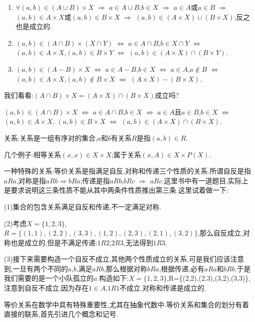 \documentclass[12pt,a4paper,openany]{book}
\begin{document}
\begin{enumerate}
\item $\forall (a,b) \in (A \cup B) \times X$ $\Rightarrow$ $a \in A \cup B$,$b \in X$ $\Rightarrow$ $a \in A$或$a \in B$ $\Rightarrow$ $(a,b) \in A \times X$或$(a,b) \in B \times X$ $\Rightarrow$ $(a,b) \in (A \times X) \cup (B \times X)$;反之也是成立的.
\item $(a,b) \in (A \cap B) \times (X \cap Y)$ $\Leftrightarrow$ $a \in A \cap B$,$b \in X \cap Y$ $\Leftrightarrow$ $(a,b) \in A \times X$,$(a,b) \in B \times Y$ $\Leftrightarrow$ $(a,b) \in (A \times X) \cap (B \times Y)$.
\item $(a,b) \in (A-B) \times X$ $\Leftrightarrow$ $a \in A-B$,$b \in X$ $\Leftrightarrow$ $a \in A$,$a \notin B$ $\Leftrightarrow$ $(a,b) \in A \times X$,$(a,b) \notin B \times X$ $\Leftrightarrow$ $(A \times X)-(B \times X)$.
\end{enumerate}

我们看看:$(A \cap B) \times X = (A \times X) \cap (B \times X)$成立吗?

$(a,b) \in (A \cap B) \times X$ $\Leftrightarrow$ $a \in A \cap B$,$b \in X$ $\Leftrightarrow$ $a \in A$且$a \in B$,$b \in X$ $\Leftrightarrow$ $(a,b) \in A \times X$, $(a,b) \in B \times X$ $\Leftrightarrow$ $(a,b) \in (A \times X) \cap (B \times X)$.

关系:关系是一组有序对的集合,$a$和$b$有关系$R$是指$(a,b) \in R$.

几个例子:相等关系$(x,x) \in X \times X$;属于关系$(x,A) \in X \times P(X)$.

一种特殊的关系:等价关系是指满足自反,对称和传递三个性质的关系.所谓自反是指$aRa$,对称是指$aRb\Rightarrow bRa$;传递是指$aRb$,$bRc$ $\Rightarrow$ $aRc$.这里书中有一道题目,实际上是要求说明这三条性质不能从其中两条件性质推出第三条.这里试着做一下:

(1)集合的包含关系满足自反和传递,不一定满足对称.

(2)考虑$X=\{1,2,3\}$,$R=\{(1,1),(2,2),(3,3),(1,2),(2,3),(2,1),(3,2)\}$,那么自反成立,对称也是成立的,但是不满足传递:$1R2$,$2R3$,无法得到$1R3$.

(3)接下来需要构造一个自反不成立,其他两个性质成立的关系,可是我们应该注意到,一旦有两个不同的$a$,$b$,满足$aRb$,那么根据对称$bRa$,根据传递,必有$aRa$和$bRb$.于是我们需要的是一个小队孤立的$a$.构造如下:$X=\{1,2,3\}$,R=\{(2,2),(2,3),(3,2),(3,3)\},注意到自反不成立,因为存在$1\in A$,$1R1$不成立.对称和传递是成立的.

等价关系在数学中具有特殊重要性,尤其在抽象代数中.等价关系和集合的划分有着直接的联系,首先引进几个概念和记号.
\end{document}
